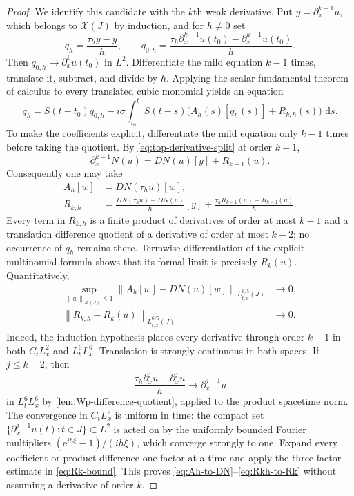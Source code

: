 \documentclass[11pt,oneside]{book}
\theoremstyle{definition}
\theoremstyle{remark}
\newcommand{\1}{\mathbf 1}
\newcommand{\dd}{\,\mathrm d}
\newcommand{\norm}[1]{\left\lVert #1\right\rVert}
\newcommand{\e}{\mathrm e}
\begin{document}
\begin{proof}
We identify this candidate with the $k$th weak derivative.  Put
$y=\partial_x^{k-1}u$, which belongs to $\mathcal X(J)$ by induction, and
for $h\ne0$ set
\[
 q_h=\frac{\tau_hy-y}{h},
 \qquad q_{0,h}=\frac{\tau_h\partial_x^{k-1}u(t_0)
                         -\partial_x^{k-1}u(t_0)}h.
\]
Then $q_{0,h}\to\partial_x^ku(t_0)$ in $L^2$.  Differentiate the mild
equation $k-1$ times, translate it, subtract, and divide by $h$.  Applying
the scalar fundamental theorem of calculus to every translated cubic
monomial yields an equation
\begin{equation}
 q_h=S(t-t_0)q_{0,h}
 -i\sigma\int_{t_0}^tS(t-s)
       \bigl(A_h(s)[q_h(s)]+R_{k,h}(s)\bigr)\,\dd s.              \label{eq:Hk-dq-equation}
\end{equation}
To make the coefficients explicit, differentiate the mild equation only
$k-1$ times before taking the quotient.  By
\eqref{eq:top-derivative-split} at order $k-1$,
\[
 \partial_x^{k-1}N(u)=DN(u)[y]+R_{k-1}(u).
\]
Consequently one may take
\begin{align*}
 A_h[w]&=DN(\tau_hu)[w],\\
 R_{k,h}
 &=\frac{DN(\tau_hu)-DN(u)}h[y]
   +\frac{\tau_hR_{k-1}(u)-R_{k-1}(u)}h.
\end{align*}
Every term in $R_{k,h}$ is a finite product of derivatives of order at most
$k-1$ and a translation difference quotient of a derivative of order at most
$k-2$; no occurrence of $q_h$ remains there.  Termwise differentiation of
the explicit multinomial formula shows that its formal limit is precisely
$R_k(u)$.  Quantitatively,
\begin{align}
 \sup_{\norm w_{\mathcal X(J)}\le1}
 \norm{A_h[w]-DN(u)[w]}_{L^{6/5}_{t,x}(J)}
 &\longrightarrow0,                                \label{eq:Ah-to-DN}\\
 \norm{R_{k,h}-R_k(u)}_{L^{6/5}_{t,x}(J)}
 &\longrightarrow0.                                \label{eq:Rkh-to-Rk}
\end{align}
Indeed, the induction hypothesis places every derivative through order
$k-1$ in both $C_tL^2_x$ and $L^6_tL^6_x$.  Translation is strongly
continuous in both spaces.  If $j\le k-2$, then
\[
 \frac{\tau_h\partial_x^ju-\partial_x^ju}{h}
 \longrightarrow\partial_x^{j+1}u
\]
in $L^6_tL^6_x$ by
\cref{lem:Wp-difference-quotient}, applied to the product spacetime
norm.  The
convergence in $C_tL^2_x$ is uniform in time: the compact set
$\{\partial_x^{j+1}u(t):t\in J\}\subset L^2$ is acted on by the uniformly
bounded Fourier multipliers $(\e^{ih\xi}-1)/(ih\xi)$, which converge strongly
to one.  Expand every coefficient or product difference one factor at a time
and apply the three-factor estimate in \eqref{eq:Rk-bound}.  This proves
\eqref{eq:Ah-to-DN}--\eqref{eq:Rkh-to-Rk} without assuming a derivative of
order $k$.


\end{proof}
\end{document}
